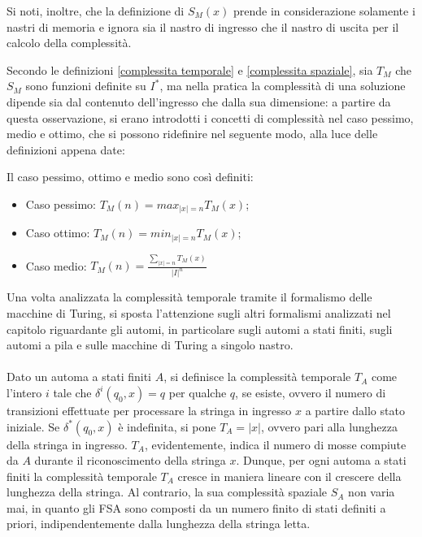   Si noti, inoltre, che la definizione di \({S}_M(x)\) prende in considerazione solamente i nastri di memoria e ignora sia il nastro di ingresso che il nastro di uscita per il calcolo della complessità.

  Secondo le definizioni \ref{complessita temporale} e \ref{complessita spaziale}, sia \({T}_M\) che \({S}_M\) sono funzioni definite su \(I^*\), ma nella pratica la complessità di una soluzione dipende sia dal contenuto dell'ingresso che dalla sua dimensione: a partire da questa osservazione, si erano introdotti i concetti di complessità nel caso pessimo, medio e ottimo, che si possono ridefinire nel seguente modo, alla luce delle definizioni appena date:

  \begin{definition}
    Il caso pessimo, ottimo e medio sono così definiti:
    \begin{itemize}
      \item Caso pessimo: \({T}_M(n)=max_{|x|=n}{T}_M(x)\);
      \item Caso ottimo: \({T}_M(n)=min_{|x|=n}{T}_M(x)\);
      \item Caso medio: \(\displaystyle {T}_M(n)=\frac{\sum_{|x|=n}{T}_M(x)}{|I|^n}\)
    \end{itemize}
  \end{definition}

  Una volta analizzata la complessità temporale tramite il formalismo delle macchine di Turing, si sposta l'attenzione sugli altri formalismi analizzati nel capitolo riguardante gli automi, in particolare sugli automi a stati finiti, sugli automi a pila e sulle macchine di Turing a singolo nastro.

  \paragraph{}
  Dato un automa a stati finiti \(A\), si definisce la complessità temporale \({T}_A\) come l'intero \(i\) tale che \(\delta^i(q_0,x)=q\) per qualche \(q\), se esiste, ovvero il numero di transizioni effettuate per processare la stringa in ingresso \(x\) a partire dallo stato iniziale. Se \(\delta^*(q_0,x)\) è indefinita, si pone \({T}_A= |x|\), ovvero pari alla lunghezza della stringa in ingresso. \({T}_A\), evidentemente, indica il numero di mosse compiute da \(A\) durante il riconoscimento della stringa \(x\). Dunque, per ogni automa a stati finiti la complessità temporale \({T}_A\) cresce in maniera lineare con il crescere della lunghezza della stringa. Al contrario, la sua complessità spaziale \({S}_A\) non varia mai, in quanto gli FSA sono composti da un numero finito di stati definiti a priori, indipendentemente dalla lunghezza della stringa letta. 

